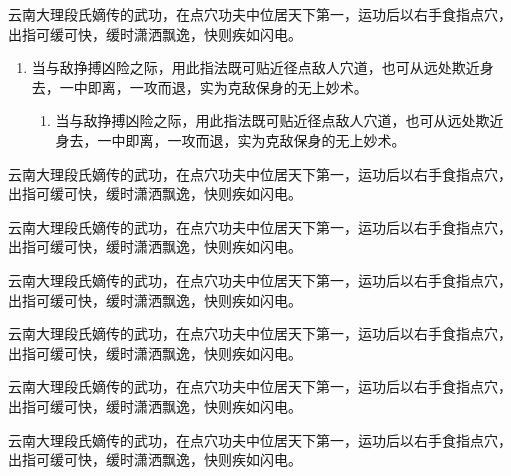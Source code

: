 \begin{theorem}[具体名称]
    云南大理段氏嫡传的武功，在点穴功夫中位居天下第一，运功后以右手食指点穴，出指可缓可快，缓时潇洒飘逸，快则疾如闪电。

    \begin{enumerate}
        \item 当与敌挣搏凶险之际，用此指法既可贴近径点敌人穴道，也可从远处欺近身去，一中即离，一攻而退，实为克敌保身的无上妙术。
        \begin{enumerate}
            \item 当与敌挣搏凶险之际，用此指法既可贴近径点敌人穴道，也可从远处欺近身去，一中即离，一攻而退，实为克敌保身的无上妙术。
        \end{enumerate}
    \end{enumerate}
\end{theorem}

\begin{proposition}[具体名称]
    云南大理段氏嫡传的武功，在点穴功夫中位居天下第一，运功后以右手食指点穴，出指可缓可快，缓时潇洒飘逸，快则疾如闪电。
\end{proposition}

\begin{corollary}[具体名称]
    云南大理段氏嫡传的武功，在点穴功夫中位居天下第一，运功后以右手食指点穴，出指可缓可快，缓时潇洒飘逸，快则疾如闪电。
\end{corollary}

\begin{lemma}[具体名称]
    云南大理段氏嫡传的武功，在点穴功夫中位居天下第一，运功后以右手食指点穴，出指可缓可快，缓时潇洒飘逸，快则疾如闪电。
\end{lemma}

\begin{example}[具体名称]
    云南大理段氏嫡传的武功，在点穴功夫中位居天下第一，运功后以右手食指点穴，出指可缓可快，缓时潇洒飘逸，快则疾如闪电。
\end{example}

\begin{assumption}[具体名称]
    云南大理段氏嫡传的武功，在点穴功夫中位居天下第一，运功后以右手食指点穴，出指可缓可快，缓时潇洒飘逸，快则疾如闪电。
\end{assumption}

\begin{annotation}[具体名称]
    云南大理段氏嫡传的武功，在点穴功夫中位居天下第一，运功后以右手食指点穴，出指可缓可快，缓时潇洒飘逸，快则疾如闪电。
\end{annotation}

